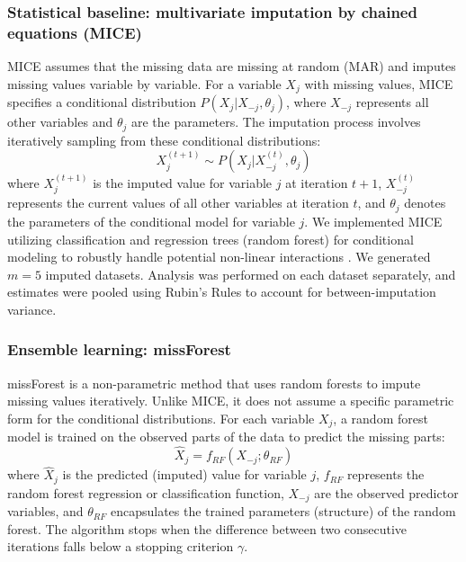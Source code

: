 \documentclass[pdflatex,sn-mathphys-num]{sn-jnl}%
\theoremstyle{thmstyleone}%
\theoremstyle{thmstyletwo}%
\theoremstyle{thmstylethree}%
\begin{document}
\subsubsection{Statistical baseline: multivariate imputation by chained equations (MICE)}
MICE \cite{van2011mice} assumes that the missing data are missing at random (MAR) and imputes missing values variable by variable. For a variable $X_j$ with missing values, MICE specifies a conditional distribution $P(X_j | X_{-j}, \theta_j)$, where $X_{-j}$ represents all other variables and $\theta_j$ are the parameters. The imputation process involves iteratively sampling from these conditional distributions:
\begin{equation}
X_j^{(t+1)} \sim P(X_j | X_{-j}^{(t)}, \theta_j)
\end{equation}
where $X_j^{(t+1)}$ is the imputed value for variable $j$ at iteration $t+1$, $X_{-j}^{(t)}$ represents the current values of all other variables at iteration $t$, and $\theta_j$ denotes the parameters of the conditional model for variable $j$.
We implemented MICE utilizing classification and regression trees (random forest) for conditional modeling to robustly handle potential non-linear interactions \cite{shah2014comparison}. We generated $m=5$ imputed datasets. Analysis was performed on each dataset separately, and estimates were pooled using Rubin's Rules \cite{rubin1987multiple} to account for between-imputation variance.

\subsubsection{Ensemble learning: missForest}
missForest \cite{stekhoven2012missforest} is a non-parametric method that uses random forests to impute missing values iteratively. Unlike MICE, it does not assume a specific parametric form for the conditional distributions. For each variable $X_j$, a random forest model is trained on the observed parts of the data to predict the missing parts:
\begin{equation}
\hat{X}_j = f_{RF}(X_{-j}; \theta_{RF})
\end{equation}
where $\hat{X}_j$ is the predicted (imputed) value for variable $j$, $f_{RF}$ represents the random forest regression or classification function, $X_{-j}$ are the observed predictor variables, and $\theta_{RF}$ encapsulates the trained parameters (structure) of the random forest.
The algorithm stops when the difference between two consecutive iterations falls below a stopping criterion $\gamma$.
\end{document}
